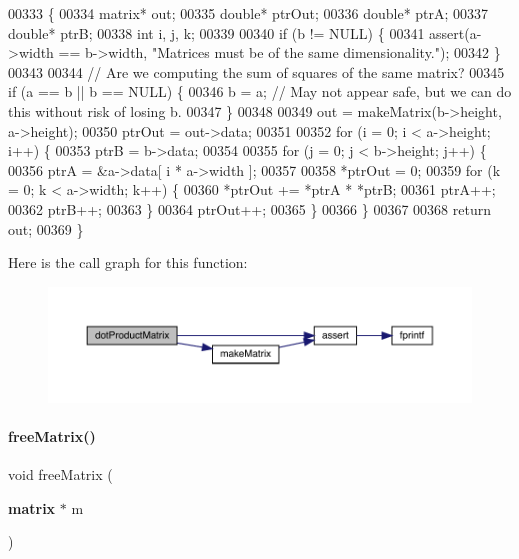 \begin{DoxyCode}
00333                                                \{
00334     matrix* out;
00335     \textcolor{keywordtype}{double}* ptrOut;
00336     \textcolor{keywordtype}{double}* ptrA;
00337     \textcolor{keywordtype}{double}* ptrB;
00338     \textcolor{keywordtype}{int} i, j, k;
00339 
00340     \textcolor{keywordflow}{if} (b != NULL) \{
00341         assert(a->width == b->width, \textcolor{stringliteral}{"Matrices must be of the same dimensionality."});
00342     \}
00343 
00344     \textcolor{comment}{// Are we computing the sum of squares of the same matrix?}
00345     \textcolor{keywordflow}{if} (a == b || b == NULL) \{
00346         b = a; \textcolor{comment}{// May not appear safe, but we can do this without risk of losing b.}
00347     \}
00348 
00349     out = makeMatrix(b->height, a->height);
00350     ptrOut = out->data;
00351 
00352     \textcolor{keywordflow}{for} (i = 0; i < a->height; i++) \{
00353         ptrB = b->data;
00354 
00355         \textcolor{keywordflow}{for} (j = 0; j < b->height; j++) \{
00356             ptrA = &a->data[ i * a->width ];
00357 
00358             *ptrOut = 0;
00359             \textcolor{keywordflow}{for} (k = 0; k < a->width; k++) \{
00360                 *ptrOut += *ptrA * *ptrB;
00361                 ptrA++;
00362                 ptrB++;
00363             \}
00364             ptrOut++;
00365         \}
00366     \}
00367 
00368     \textcolor{keywordflow}{return} out;
00369 \}
\end{DoxyCode}
Here is the call graph for this function\+:\nopagebreak
\begin{figure}[H]
\begin{center}
\leavevmode
\includegraphics[width=350pt]{matrix_8c_a0b568a64e81a56779c2141b424475976_cgraph}
\end{center}
\end{figure}
\mbox{\label{matrix_8c_ae98365c910e9d688d2bdedec50d89a6b}} 
\paragraph{free\+Matrix()}
{\footnotesize\ttfamily void free\+Matrix (\begin{DoxyParamCaption}\item[{\textbf{ matrix} $\ast$}]{m }\end{DoxyParamCaption})}



